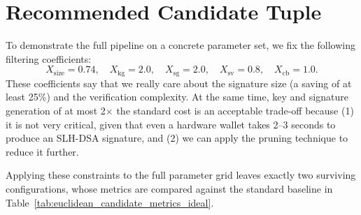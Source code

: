 \section{Recommended Candidate Tuple} \label{sec:ideal-examples}

To demonstrate the full pipeline on a concrete parameter set, we fix the following filtering coefficients:
\begin{equation*}
    X_{\text{size}} = 0.74, \quad X_{\text{kg}} = 2.0, \quad X_{\text{sg}} = 2.0,
    \quad X_{\text{sv}} = 0.8, \quad X_{\text{cb}} = 1.0.
\end{equation*}
These coefficients say that we really care about the signature size (a saving of at least 25\%) and the verification complexity. At the same time, key and signature generation of at most 2$\times$ the standard cost is an acceptable trade-off because (1) it is not very critical, given that even a hardware wallet takes 2--3 seconds to produce an SLH-DSA signature, and (2) we can apply the pruning technique \cite{conduition-blog} to reduce it further.

Applying these constraints to the full parameter grid leaves exactly two surviving configurations, whose metrics are compared against the standard baseline in Table~\ref{tab:euclidean_candidate_metrics_ideal}.

\begin{table}[htbp]
\centering
\small
\raggedright
\caption{Performance Comparison between the Standard Baseline and the Two Evaluated Candidates}
\label{tab:euclidean_candidate_metrics_ideal}
\end{table}

